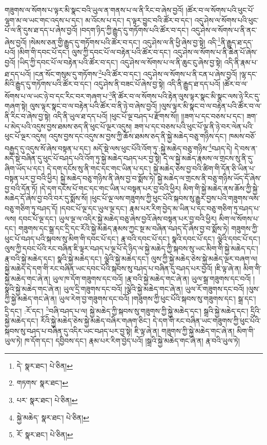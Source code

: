 གཟུགས་ལ་སོགས་པ་ལྟར་མི་སྣང་བའི་ཡུལ་ན་གནས་པ་ལ་ནི་རིང་བ་ཞེས་བྱའོ། །ཚོར་བ་ལ་སོགས་པའི་ཕུང་པོ་ལྷག་མ་ལ་ཡང་གང་འདས་པ་དང་། མ་འོངས་པ་དང་། ད་ལྟར་བྱུང་བའི་ཚོར་བ་དང་། འདུ་ཤེས་ལ་སོགས་པའི་ཕུང་པོ་ལ་ནི་དུས་ཐ་དད་པ་ཞེས་བྱའོ། །བདག་ཉིད་ཀྱི་རྒྱུད་དུ་གཏོགས་པའི་ཚོར་བ་དང་། འདུ་ཤེས་ལ་སོགས་པ་ནི་ནང་ཞེས་བྱའོ། །སེམས་ཅན་གྱི་རྒྱུད་དུ་གཏོགས་པའི་ཚོར་བ་དང་། འདུ་ཤེས་ལ་ནི་ཕྱི་ཞེས་བྱ་སྟེ། འདི་\footnote{དེ་  སྣར་ཐང་།  པེ་ཅིན། }ནི་རྒྱུད་ཐ་དད་པའོ། །མིག་གི་དབང་པོ་དང་། ལུས་ཀྱི་དབང་པོ་ལ་བརྟེན་པའི་ཚོར་བ་དང་། འདུ་ཤེས་ལ་སོགས་པ་ནི་ཆེན་པོ་ཞེས་བྱའོ། །ཡིད་ཀྱི་དབང་པོ་ལ་བརྟེན་པའི་ཚོར་བ་དང་། འདུ་ཤེས་ལ་སོགས་པ་ལ་ནི་ཆུང་ངུ་ཞེས་བྱ་སྟེ། འདི་ནི་རྣམ་པ་ཐ་དད་པའོ། །ངན་སོང་གསུམ་དུ་གཏོགས་\footnote{གཏགས་  སྣར་ཐང་། }པའི་ཚོར་བ་དང་། འདུ་ཤེས་ལ་སོགས་པ་ནི་ངན་པ་ཞེས་བྱའོ། །ལྷ་དང་མིའི་རྒྱུད་དུ་གཏོགས་པའི་ཚོར་བ་དང་། འདུ་ཤེས་ནི་བཟང་པོ་ཞེས་བྱ་སྟེ། འདི་ནི་རྒྱུད་ཐ་དད་པའོ། །ཚོར་བ་ལ་སོགས་པ་ལ་ཡང་ཉེ་བ་དང་རིང་བར་གཞག་པ་\footnote{པར་  སྣར་ཐང་།  པེ་ཅིན། }ནི་ཚོར་བ་ལ་སོགས་པའི་རྟེན་ལུས་ལྟར་སྣང་མི་སྣང་ལས་ཉེ་རིང་དུ་གཞག་སྟེ། ལུས་ལྟར་སྣང་བ་ལ་བརྟེན་པའི་ཚོར་བ་ནི་ཉེ་བ་ཞེས་བྱའོ། །ལུས་ལྟར་མི་སྣང་བ་ལ་བརྟེན་པའི་ཚོར་བ་ལ་ནི་རིང་བ་ཞེས་བྱ་སྟེ། འདི་ནི་ཡུལ་ཐ་དད་པའོ། །ཕུང་པོ་ལྔ་བཤད་པ་རྫོགས་སོ།། །།ཟག་པ་དང་བཅས་པ་དང་། ཟག་པ་མེད་པའི་འདུས་བྱས་ཐམས་ཅད་ནི་ཕུང་པོ་ལྔར་འདུས། ཟག་པ་དང་བཅས་པའི་ཕུང་པོ་ལྔ་ནི་ཉེ་བར་ལེན་པའི་ཕུང་པོ་ལྔར་འདུས། འདུས་བྱས་དང་འདུས་མ་བྱས་ཀྱི་ཆོས་ཐམས་ཅད་ནི་སྐྱེ་མཆེད་བཅུ་གཉིས་དང་། ཁམས་བཅོ་བརྒྱད་དུ་འདུས་སོ་ཞེས་བསྟན་པ་དང་། མདོ་སྡེ་ལས་ཕུང་པོའི་འོག་ཏུ་:སྐྱེ་མཆེད་བཅུ་གཉིས་\footnote{སྐྱེ་མཆེད་  སྣར་ཐང་།  པེ་ཅིན། }བཤད་དེ། དེ་བས་ན་མདོ་སྡེ་བཞིན་དུ་ཕུང་པོ་བཤད་པའི་འོག་ཏུ་སྐྱེ་མཆེད་བཤད་པར་བྱ་སྟེ། དེ་ལ་སྐྱེ་མཆེད་རྣམས་ལ་གྲངས་སུ་ནི་དུ་ཞིག་ཡོད་པ་དང་། དེ་དག་དངོས་སུ་ནི་གང་དང་གང་ཡིན་པ་དང་། སྐྱེ་མཆེད་ཅེས་བྱ་བའི་ཚིག་གི་དོན་ཅི་ཡིན་པ་བསྟན་པར་བྱ་བའི་ཕྱིར། སྐྱེ་མཆེད་བཅུ་གཉིས་ནི་ཞེས་བྱ་བ་སྨོས་ཏེ། སྐྱེ་མཆེད་ལ་གྲངས་ནི་བཅུ་གཉིས་ཡོད་དོ་ཞེས་བྱ་བའི་དོན་ཏོ། །དེ་དག་དངོས་པོ་གང་དང་གང་ཡིན་པ་བསྟན་པར་བྱ་བའི་ཕྱིར། མིག་གི་སྐྱེ་མཆེད་ནས་ཆོས་ཀྱི་སྐྱེ་མཆེད་དོ་ཞེས་བྱ་བའི་བར་དུ་སྨོས་སོ། །ཕུང་པོ་ལྔ་ལས་གཟུགས་ཀྱི་ཕུང་པོའི་སྐབས་སུ་རྒྱུར་བྱས་པའི་གཟུགས་ལས་བཅུ་གཅིག་ཏུ་བཤད་དོ། །དབང་པོ་ལྔ་དང་ཡུལ་ལྔ་དང་། རྣམ་པར་རིག་བྱེད་མ་ཡིན་པ་དང་བཅུ་གཅིག་ཏུ་བཤད་པ་ལས། དབང་པོ་ལྔ་དང་། ཡུལ་ལྔ་ལ་འདིར་སྐྱེ་མཆེད་བཅུ་ཞེས་བྱའོ་ཞེས་བསྟན་པར་བྱ་བའི་ཕྱིར། མིག་ལ་སོགས་པ་དང་། གཟུགས་དང་སྒྲ་དང་དྲི་དང་རོའི་སྐྱེ་མཆེད་རྣམས་ཀྱང་སྔ་མ་བཞིན་བཤད་དོ་ཞེས་བྱ་བ་སྨོས་ཏེ། གཟུགས་ཀྱི་ཕུང་པོ་བཤད་པའི་སྐབས་སུ་མིག་གི་དབང་པོ་དང་། རྣ་བའི་དབང་པོ་དང་། སྣའི་དབང་པོ་དང་། ལྕེའི་དབང་པོ་དང་། ལུས་ཀྱི་དབང་པོའི་རང་བཞིན་ཇི་ལྟར་བཤད་པ་ལྔ་པོ་དེ་ཉིད་ལ་སྐྱེ་མཆེད་ཀྱི་སྐབས་སུ་ཡང་མིག་གི་སྐྱེ་མཆེད་དང་། རྣ་བའི་སྐྱེ་མཆེད་དང་། སྣའི་སྐྱེ་མཆེད་དང་། ལྕེའི་སྐྱེ་མཆེད་དང་། ལུས་ཀྱི་སྐྱེ་མཆེད་ཅེས་སྐྱེ་མཆེད་ལྔར་བཞག་ལ། སྐྱེ་མཆེད་དེ་དག་གི་རང་བཞིན་ཡང་དབང་པོའི་སྐབས་སུ་བཤད་པ་བཞིན་དུ་བཤད་པར་བྱའོ། །ཇི་ལྟ་ཞེ་ན། མིག་གི་སྐྱེ་མཆེད་གང་ཞེ་ན། ཡུལ་ཁ་དོག་གཟུགས་དང་བའོ། །རྣ་བའི་སྐྱེ་མཆེད་གང་ཞེ་ན། ཡུལ་སྒྲ་གཟུགས་དང་བའོ། །སྣའི་སྐྱེ་མཆེད་གང་ཞེ་ན། ཡུལ་དྲི་གཟུགས་དང་བའོ། །ལྕེའི་སྐྱེ་མཆེད་གང་ཞེ་ན། ཡུལ་རོ་གཟུགས་དང་བའོ། །ལུས་ཀྱི་སྐྱེ་མཆེད་གང་ཞེ་ན། ཡུལ་རེག་བྱ་གཟུགས་དང་བའོ། །གཟུགས་ཀྱི་ཕུང་པོའི་སྐབས་སུ་གཟུགས་དང་། སྒྲ་དང་། དྲི་དང་། :རོ་དང་། \footnote{རོ་  སྣར་ཐང་།  པེ་ཅིན། }བཞི་བཤད་པ་ལ། སྐྱེ་མཆེད་ཀྱི་སྐབས་སུ་གཟུགས་ཀྱི་སྐྱེ་མཆེད་དང་། སྒྲའི་སྐྱེ་མཆེད་དང་། དྲིའི་སྐྱེ་མཆེད་དང་། རོའི་སྐྱེ་མཆེད་ཅེས་སྐྱེ་མཆེད་བཞིར་གཞག་ཅིང་། དེ་དག་གི་རང་བཞིན་ཡང་གཟུགས་ཀྱི་ཕུང་པོའི་སྐབས་སུ་བཤད་པ་བཞིན་དུ་འདིར་ཡང་བཤད་པར་བྱ་སྟེ། ཇི་ལྟ་ཞེ་ན། གཟུགས་ཀྱི་སྐྱེ་མཆེད་གང་ཞེ་ན། མིག་གི་ཡུལ་ཏེ། ཁ་དོག་དང་། དབྱིབས་དང་། རྣམ་པར་རིག་བྱེད་པའོ། །སྒྲའི་སྐྱེ་མཆེད་གང་ཞེ་ན། རྣ་བའི་ཡུལ་ཏེ། 